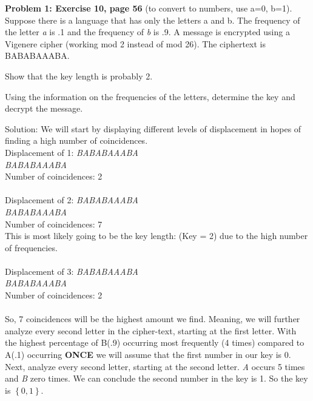 \documentclass[12pt,letterpaper,final]{report}
\begin{document}

\vline


\noindent\textbf{Problem 1: Exercise 10, page 56}
 (to convert to numbers, use a=0, b=1). Suppose there is a language that has only the letters a and b. The frequency of the letter \textit a is .1 and the frequency of \textit b is .9. A message
is encrypted using a Vigenere cipher (working mod 2 instead of mod
26). The ciphertext is BABABAAABA.

\bigskip
{}
\begin{alphalist}
	\item Show that the key length is probably 2.
	\item Using the information on the frequencies of the letters, determine the key and decrypt the message.
\end{alphalist}
\bigskip  Solution: We will start by displaying different levels of displacement in hopes of finding a high number of coincidences. \\
Displacement of 1:  \indent\indent \textit{BABABAAABA} \\
\phantom{BBBBBBBBBB}  \indent\indent \textit{BABABAAABA} \\
Number of coincidences: 2 \\\\
Displacement of 2:  \indent\indent \textit{BABABAAABA} \\
\phantom{BBBBBBBBB}  \indent\indent \textit{BABABAAABA} \\
Number of coincidences: 7 \\ This is most likely going to be the key length: (Key = 2) due to the high number of frequencies.\\\\
Displacement of 3: \indent\indent \textit{BABABAAABA} \\
\phantom{BBBBBBBB} \indent\indent \textit{BABABAAABA} \\
Number of coincidences: 2 \\\\
So, 7 coincidences will be the highest amount we find. Meaning, we will further analyze every second letter in the cipher-text, starting at the first letter. With the highest percentage of B(.9) occurring most frequently (4 times) compared to A(.1) occurring \textbf{ONCE} we will assume that the first number in our key is 0. Next, analyze every second letter, starting at the second letter. \textit A occurs 5 times and \textit B zero times. We can conclude the second number in the key is 1. So the key is $\left\{0,1 \right\}$.
\end{document}
